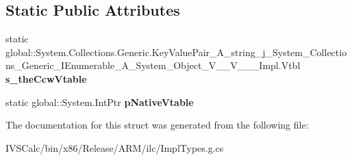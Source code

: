 \subsection*{Static Public Attributes}
\begin{DoxyCompactItemize}
\item 
\mbox{\label{struct_system_1_1_collections_1_1_generic_1_1_key_value_pair___a__string__j___system___collectiob611aa8205ecce9d7fe907374986c9f4_ad65d32fde31a161898986039a21ebaa2}} 
static global\+::\+System.\+Collections.\+Generic.\+Key\+Value\+Pair\+\_\+\+A\+\_\+string\+\_\+j\+\_\+\+System\+\_\+\+Collections\+\_\+\+Generic\+\_\+\+I\+Enumerable\+\_\+\+A\+\_\+\+System\+\_\+\+Object\+\_\+\+V\+\_\+\+\_\+\+V\+\_\+\+\_\+\+\_\+\+Impl.\+Vtbl {\bfseries s\+\_\+the\+Ccw\+Vtable}
\item 
\mbox{\label{struct_system_1_1_collections_1_1_generic_1_1_key_value_pair___a__string__j___system___collectiob611aa8205ecce9d7fe907374986c9f4_a11824c878a94b184f13e65f2ea86ba4e}} 
static global\+::\+System.\+Int\+Ptr {\bfseries p\+Native\+Vtable}
\end{DoxyCompactItemize}


The documentation for this struct was generated from the following file\+:\begin{DoxyCompactItemize}
\item 
I\+V\+S\+Calc/bin/x86/\+Release/\+A\+R\+M/ilc/Impl\+Types.\+g.\+cs\end{DoxyCompactItemize}
